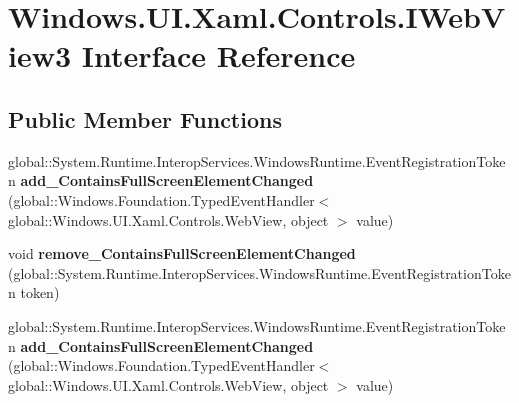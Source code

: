 \hypertarget{interface_windows_1_1_u_i_1_1_xaml_1_1_controls_1_1_i_web_view3}{}\section{Windows.\+U\+I.\+Xaml.\+Controls.\+I\+Web\+View3 Interface Reference}
\label{interface_windows_1_1_u_i_1_1_xaml_1_1_controls_1_1_i_web_view3}
\subsection*{Public Member Functions}
\begin{DoxyCompactItemize}
\item 
\mbox{\label{interface_windows_1_1_u_i_1_1_xaml_1_1_controls_1_1_i_web_view3_a27cfc7b668036cd493d82322e512bb47}} 
global\+::\+System.\+Runtime.\+Interop\+Services.\+Windows\+Runtime.\+Event\+Registration\+Token {\bfseries add\+\_\+\+Contains\+Full\+Screen\+Element\+Changed} (global\+::\+Windows.\+Foundation.\+Typed\+Event\+Handler$<$ global\+::\+Windows.\+U\+I.\+Xaml.\+Controls.\+Web\+View, object $>$ value)
\item 
\mbox{\label{interface_windows_1_1_u_i_1_1_xaml_1_1_controls_1_1_i_web_view3_a6ad0108837b4ebd70baffc34984d2476}} 
void {\bfseries remove\+\_\+\+Contains\+Full\+Screen\+Element\+Changed} (global\+::\+System.\+Runtime.\+Interop\+Services.\+Windows\+Runtime.\+Event\+Registration\+Token token)
\item 
\mbox{\label{interface_windows_1_1_u_i_1_1_xaml_1_1_controls_1_1_i_web_view3_a27cfc7b668036cd493d82322e512bb47}} 
global\+::\+System.\+Runtime.\+Interop\+Services.\+Windows\+Runtime.\+Event\+Registration\+Token {\bfseries add\+\_\+\+Contains\+Full\+Screen\+Element\+Changed} (global\+::\+Windows.\+Foundation.\+Typed\+Event\+Handler$<$ global\+::\+Windows.\+U\+I.\+Xaml.\+Controls.\+Web\+View, object $>$ value)
\item 
\mbox{\label{interface_windows_1_1_u_i_1_1_xaml_1_1_controls_1_1_i_web_view3_a6ad0108837b4ebd70baffc34984d2476}} 

\end{DoxyCompactItemize}

